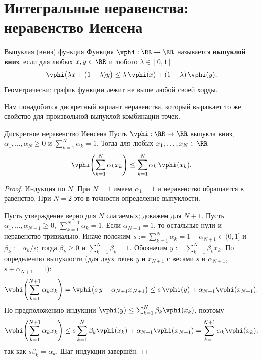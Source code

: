 
\section{Интегральные неравенства: неравенство Иенсена}

\begin{Definition}{Выпуклая (вниз) функция}{}
	Функция $\vphi:\RR\to\RR$ называется \textbf{выпуклой вниз}, если для любых
	$x,y\in\RR$ и любого $\lambda\in[0,1]$
	\[
	\vphi\bigl(\lambda x+(1-\lambda)y\bigr)\le \lambda\,\vphi(x)+(1-\lambda)\,\vphi(y).
	\]
	Геометрически: график функции лежит не выше любой своей хорды.
\end{Definition}

Нам понадобится дискретный вариант неравенства, который выражает то же
свойство для произвольной выпуклой комбинации точек.

\begin{Lemma}{Дискретное неравенство Иенсена}{}
	Пусть $\vphi:\RR\to\RR$ выпукла вниз, $\alpha_1,\dots,\alpha_N\ge0$ и
	$\sum_{k=1}^N\alpha_k=1$. Тогда для любых $x_1,\dots,x_N\in\RR$
	\[
	\vphi\!\left(\sum_{k=1}^N \alpha_k x_k\right)\le \sum_{k=1}^N \alpha_k\,\vphi(x_k).
	\]
\end{Lemma}

\begin{proof}
	Индукция по $N$. При $N=1$ имеем $\alpha_1=1$ и неравенство обращается в
	равенство. При $N=2$ это в точности определение выпуклости.

	Пусть утверждение верно для $N$ слагаемых; докажем для $N+1$. Пусть
	$\alpha_1,\dots,\alpha_{N+1}\ge0$, $\sum_{k=1}^{N+1}\alpha_k=1$. Если
	$\alpha_{N+1}=1$, то остальные нули и неравенство тривиально. Иначе положим
	$s:=\sum_{k=1}^{N}\alpha_k=1-\alpha_{N+1}\in(0,1]$ и $\beta_k:=\alpha_k/s$;
	тогда $\beta_k\ge0$ и $\sum_{k=1}^N\beta_k=1$. Обозначим
	$y:=\sum_{k=1}^N\beta_k x_k$. По определению выпуклости (для двух точек $y$ и
	$x_{N+1}$ с весами $s$ и $\alpha_{N+1}$, $s+\alpha_{N+1}=1$):
	\[
	\vphi\!\left(\sum_{k=1}^{N+1}\alpha_k x_k\right)
	=\vphi\bigl(s\,y+\alpha_{N+1}x_{N+1}\bigr)
	\le s\,\vphi(y)+\alpha_{N+1}\vphi(x_{N+1}).
	\]
	По предположению индукции $\vphi(y)\le\sum_{k=1}^N\beta_k\vphi(x_k)$, поэтому
	\[
	\vphi\!\left(\sum_{k=1}^{N+1}\alpha_k x_k\right)
	\le s\sum_{k=1}^N\beta_k\vphi(x_k)+\alpha_{N+1}\vphi(x_{N+1})
	=\sum_{k=1}^{N+1}\alpha_k\vphi(x_k),
	\]
	так как $s\beta_k=\alpha_k$. Шаг индукции завершён.
\end{proof}


